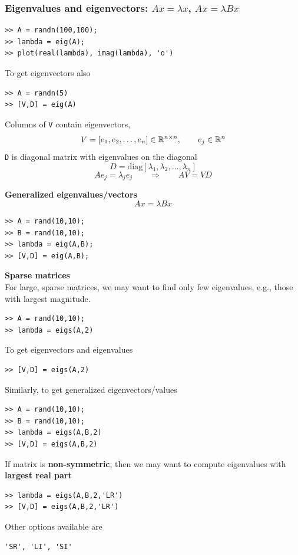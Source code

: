 \documentclass[11pt,xcolor=svgnames,onlymath]{beamer}
\begin{document}
\begin{frame}
\frametitle{Eigenvalues and eigenvectors: $Ax=\lambda x$, $Ax = \lambda Bx$}
\begin{lstlisting}
>> A = randn(100,100);
>> lambda = eig(A);
>> plot(real(lambda), imag(lambda), 'o')
\end{lstlisting}

To get eigenvectors also
\begin{lstlisting}
>> A = randn(5)
>> [V,D] = eig(A)
\end{lstlisting}
Columns of {\tt V} contain eigenvectors, 
\[
V = [e_1, e_2, \ldots, e_n] \in \mathbb{R}^{n \times n}, \qquad e_j \in \mathbb{R}^n
\]
{\tt D} is diagonal matrix with eigenvalues on the diagonal
\[
D = \mbox{diag}[\lambda_1, \lambda_2, \ldots, \lambda_n]
\]
\[
Ae_j = \lambda_j e_j \qquad \Longrightarrow \qquad A V = V D
\]

\pagebreak

{\bf Generalized eigenvalues/vectors}
\[
Ax = \lambda Bx
\]
\begin{lstlisting}
>> A = rand(10,10);
>> B = rand(10,10);
>> lambda = eig(A,B);
>> [V,D] = eig(A,B);
\end{lstlisting}

\vspace{2mm}

{\bf Sparse matrices}\\
For large, sparse matrices, we may want to find only few eigenvalues, e.g., those with largest magnitude.
\begin{lstlisting}
>> A = rand(10,10);
>> lambda = eigs(A,2)
\end{lstlisting}
To get eigenvectors and eigenvalues
\begin{lstlisting}
>> [V,D] = eigs(A,2)
\end{lstlisting}
Similarly, to get generalized eigenvectors/values
\begin{lstlisting}
>> A = rand(10,10);
>> B = rand(10,10);
>> lambda = eigs(A,B,2)
>> [V,D] = eigs(A,B,2)
\end{lstlisting}

If matrix is {\bf non-symmetric}, then we may want to compute eigenvalues with {\bf largest real part}
\begin{lstlisting}
>> lambda = eigs(A,B,2,'LR')
>> [V,D] = eigs(A,B,2,'LR')
\end{lstlisting}
Other options available are
\begin{lstlisting}
'SR', 'LI', 'SI'
\end{lstlisting}

\end{frame}
\end{document}
